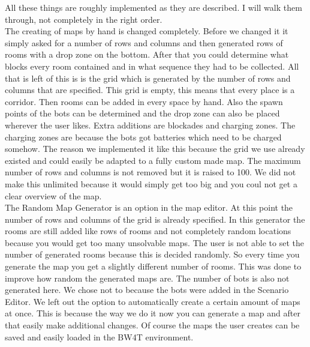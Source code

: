 \documentclass[]{article}
\begin{document}
All these things are roughly implemented as they are described. 
I will walk them through, not completely in the right order. \\
\indent The creating of maps by hand is changed completely. Before we changed it it simply asked for a number of rows and columns and then generated rows of rooms with a drop zone on the bottom. After that you could determine what blocks every room contained and in what sequence they had to be collected. All that is left of this is is the grid which is generated by the number of rows and columns that are specified. This grid is empty, this means that every place is a corridor. Then rooms can be added in every space by hand. Also the spawn points of the bots can be determined and the drop zone can also be placed wherever the user likes. Extra additions are blockades and charging zones. The charging zones are because the bots got batteries which need to be charged somehow. The reason we implemented it like this because the grid we use already existed and could easily be adapted to a fully custom made map. The maximum number of rows and columns is not removed but it is raised to 100. We did not make this unlimited because it would simply get too big and you coul not get a clear overview of the map.\\
\indent The Random Map Generator is an option in the map editor. At this point the number of rows and columns of the grid is already specified. In this generator the rooms are still added like rows of rooms and not completely random locations because you would get too many unsolvable maps. The user is not able to set the number of generated rooms because this is decided randomly. So every time you generate the map you get a slightly different number of rooms. This was done to improve how random the generated maps are. The number of bots is also not generated here. We chose not to because the bots were added in the Scenario Editor. We left out the option to automatically create a certain amount of maps at once. This is because the way we do it now you can generate a map and after that easily make additional changes. Of course the maps the user creates can be saved and easily loaded in the BW4T environment.\\
\end{document}
